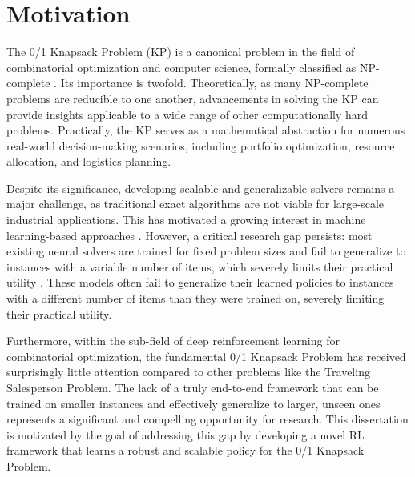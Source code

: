 \section{Motivation}
\enlargethispage{\baselineskip}

The 0/1 Knapsack Problem (KP) is a canonical problem in the field of combinatorial optimization and computer science, formally classified as NP-complete \cite{cappartCombinatorialOptimizationReasoning2022}. Its importance is twofold. Theoretically, as many NP-complete problems are reducible to one another, advancements in solving the KP can provide insights applicable to a wide range of other computationally hard problems. Practically, the KP serves as a mathematical abstraction for numerous real-world decision-making scenarios, including portfolio optimization, resource allocation, and logistics planning.

Despite its significance, developing scalable and generalizable solvers remains a major challenge, as traditional exact algorithms are not viable for large-scale industrial applications. This has motivated a growing interest in machine learning-based approaches \cite{wangSolvingCombinatorialOptimization2024}. However, a critical research gap persists: most existing neural solvers are trained for fixed problem sizes and fail to generalize to instances with a variable number of items, which severely limits their practical utility \cite{belloNeuralCombinatorialOptimization2017}. These models often fail to generalize their learned policies to instances with a different number of items than they were trained on, severely limiting their practical utility.

Furthermore, within the sub-field of deep reinforcement learning for combinatorial optimization, the fundamental 0/1 Knapsack Problem has received surprisingly little attention compared to other problems like the Traveling Salesperson Problem. The lack of a truly end-to-end framework that can be trained on smaller instances and effectively generalize to larger, unseen ones represents a significant and compelling opportunity for research. This dissertation is motivated by the goal of addressing this gap by developing a novel RL framework that learns a robust and scalable policy for the 0/1 Knapsack Problem.